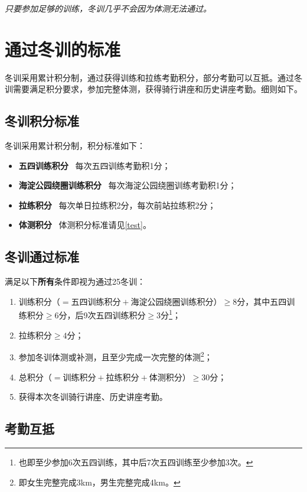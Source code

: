 \documentclass[UTF8]{ctexart}
\begin{document}
\textit{只要参加足够的训练，冬训几乎不会因为体测无法通过。} 

\section{通过冬训的标准}

冬训采用累计积分制，通过获得训练和拉练考勤积分，部分考勤可以互抵。通过冬训需要满足积分要求，参加完整体测，获得骑行讲座和历史讲座考勤。细则如下。


\subsection{冬训积分标准}
冬训采用累计积分制，积分标准如下：

\begin{itemize}[nosep,left=4em]
    \item \textbf{五四训练积分} \ 每次五四训练考勤积1分；
    \item \textbf{海淀公园绕圈训练积分} \ 每次海淀公园绕圈训练考勤积1分；
    \item \textbf{拉练积分} \  每次单日拉练积2分，每次前站拉练积2分；
    \item \textbf{体测积分} \  体测积分标准请见\ref{test}。 
\end{itemize}

\subsection{冬训通过标准}

满足以下\textbf{所有}条件即视为通过25冬训：
\begin{enumerate}[nosep,left=4em]
    \item 训练积分（$=\text{五四训练积分}+\text{海淀公园绕圈训练积分}$）$\ge 8$分，其中五四训练积分$\ge 6$分，后9次五四训练积分$\ge 3$分\footnote{也即至少参加6次五四训练，其中后7次五四训练至少参加3次。}；
    \item 拉练积分$\ge 4$分；
    \item 参加冬训体测或补测，且至少完成一次完整的体测\footnote{即女生完整完成3km，男生完整完成4km。}；
    \item 总积分（$=\text{训练积分}+\text{拉练积分}+\text{体测积分}$）$\ge 30$分；
    \item 获得本次冬训骑行讲座、历史讲座考勤。
\end{enumerate}

\subsection{考勤互抵}
\end{document}
